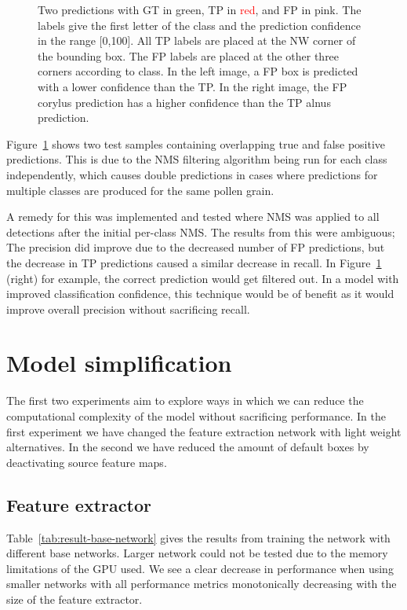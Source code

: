 \begin{figure}[htb]
\begin{subfigure}[t]{0.4\textwidth}
  \end{subfigure}
  \caption[Predictions showing TP overlapped by FP from different class]{Two predictions with GT in \textcolor{nicegreen}{green}, TP in \textcolor{red}{red}, and FP in \textcolor{nicepink}{pink}.
The labels give the first letter of the class and the prediction confidence in the range [0,100].
All TP labels are placed at the NW corner of the bounding box.
The FP labels are placed at the other three corners according to class.
In the left image, a FP box is predicted with a lower confidence than the TP\@.
In the right image, the FP corylus prediction has a higher confidence than the TP alnus prediction.}\label{fig:method-overlapping-predictions}
\end{figure}

Figure~\ref{fig:method-overlapping-predictions} shows two test samples containing overlapping true and false positive predictions.
This is due to the NMS filtering algorithm being run for each class independently, which causes double predictions in cases where predictions for multiple classes are produced for the same pollen grain.

A remedy for this was implemented and tested where NMS was applied to all detections after the initial per-class NMS\@.
The results from this were ambiguous; The precision did improve due to the decreased number of FP predictions, but the decrease in TP predictions caused a similar decrease in recall.
In Figure~\ref{fig:method-overlapping-predictions} (right) for example, the correct prediction would get filtered out.
In a model with improved classification confidence, this technique would be of benefit as it would improve overall precision without sacrificing recall.

\section{Model simplification}\label{sec:results-simplification}
The first two experiments aim to explore ways in which we can reduce the computational complexity of the model without sacrificing performance.
In the first experiment we have changed the feature extraction network with light weight alternatives.
In the second we have reduced the amount of default boxes by deactivating source feature maps.

\subsection{Feature extractor}
Table~\ref{tab:result-base-network} gives the results from training the network with different base networks.
Larger network could not be tested due to the memory limitations of the GPU used.
We see a clear decrease in performance when using smaller networks with all performance metrics monotonically decreasing with the size of the feature extractor.

